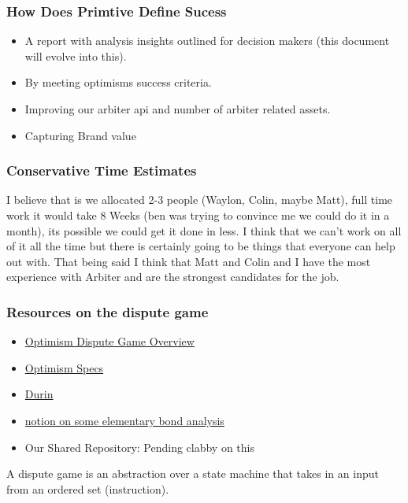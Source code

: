 \documentclass[14pt]{extarticle}
\begin{document}
\subsubsection{How Does Primtive Define Sucess}

\begin{itemize}
  \item A report with analysis insights outlined for decision makers (this document will evolve into this).
  \item By meeting optimisms success criteria.
  \item Improving our arbiter api and number of arbiter related assets.
  \item Capturing Brand value 
\end{itemize}

\subsubsection{Conservative Time Estimates}
I believe that is we allocated 2-3 people (Waylon, Colin, maybe Matt), full time work it would take 8 Weeks (ben was trying to convince me we could do it in a month), its possible we could get it done in less. 
I think that we can't work on all of it all the time but there is certainly going to be things that everyone can help out with.
That being said I think that Matt and Colin and I have the most experience with Arbiter and are the strongest candidates for the job.
\subsubsection{Resources on the dispute game}

\begin{itemize}
  \item \href{https://www.youtube.com/watch?v=nIN5sNc6nQM}{Optimism Dispute Game Overview}
  \item \href{https://github.com/ethereum-optimism/optimism/blob/develop/specs/fault-dispute-game.md}{Optimism Specs}
  \item \href{https://github.com/anton-rs/durin}{Durin}
  \item \href{https://www.notion.so/oplabs/Bondorama-886cd1cfefcc44649f3e16f47d9a4477?pvs=4}{notion on some elementary bond analysis}
  \item Our Shared Repository: Pending clabby on this
\end{itemize}

A dispute game is an abstraction over a state machine that takes in an input from an ordered set (instruction).
\end{document}
